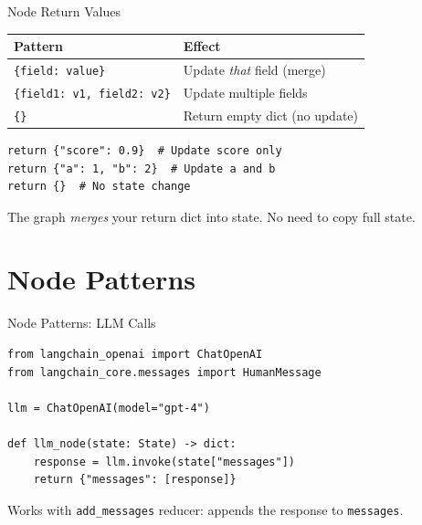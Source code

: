 \documentclass[aspectratio=169,11pt]{beamer}
\begin{document}
\begin{frame}[fragile,t]{Node Return Values}
\vspace{0.1cm}

\begin{tabular}{p{4cm}p{7cm}}
\toprule
\textbf{Pattern} & \textbf{Effect} \\
\midrule
\texttt{\{field: value\}} & Update \textit{that} field (merge) \\
\texttt{\{field1: v1, field2: v2\}} & Update multiple fields \\
\texttt{\{\}} & Return empty dict (no update) \\
\bottomrule
\end{tabular}

\vspace{0.15cm}

\begin{codebox}[Examples]
\begin{lstlisting}
return {"score": 0.9}  # Update score only
return {"a": 1, "b": 2}  # Update a and b
return {}  # No state change
\end{lstlisting}
\end{codebox}

\vspace{0.15cm}

{\footnotesize The graph \textit{merges} your return dict into state. No need to copy full state.}
\end{frame}

\section{Node Patterns}
\begin{frame}[fragile,t]{Node Patterns: LLM Calls}
\vspace{0.05cm}

\begin{codebox}
\begin{lstlisting}
from langchain_openai import ChatOpenAI
from langchain_core.messages import HumanMessage

llm = ChatOpenAI(model="gpt-4")

def llm_node(state: State) -> dict:
    response = llm.invoke(state["messages"])
    return {"messages": [response]}
\end{lstlisting}
\end{codebox}

\vspace{0.1cm}

{\footnotesize Works with \texttt{add\_messages} reducer: appends the response to \texttt{messages}.}
\end{frame}
\end{document}
